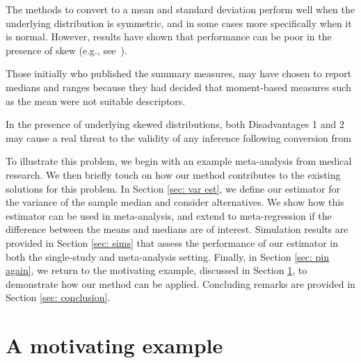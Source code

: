 \documentclass{article}
\begin{document}
\begin{disadv}\label{disadv:1}
The methods to convert to a mean and standard deviation perform well when the underlying distribution is symmetric, and in some cases more specifically when it is normal.  However, results have shown that performance can be poor in the presence of skew (e.g., see~\cite{shi2018estimate}).
\end{disadv}

\begin{disadv}\label{disadv:2}
Those initially who published the summary measures, may have chosen to report medians and ranges because they had decided that moment-based measures such as the mean were not suitable descriptors.
\end{disadv}

In the presence of underlying skewed distributions, both Disadvantages 1 and 2 may cause a real threat to the validity of any inference following conversion from

To illustrate this problem, we begin with an example meta-analysis from medical research. We then briefly touch on how our method contributes to the existing solutions for this problem. In Section \ref{sec: var est}, we define our estimator for the variance of the sample median and consider alternatives. We show how this estimator can be used in meta-analysis, and extend to meta-regression if the difference between the means and medians are of interest. Simulation results are provided in Section \ref{sec: sims} that assess the performance of our estimator in both the single-study and meta-analysis setting.   Finally, in Section \ref{sec: pin again}, we return to the motivating example, discussed in Section \ref{sec: motiv}, to demonstrate how our method can be applied. Concluding remarks are provided in Section \ref{sec: conclusion}.

\section{A motivating example}
\label{sec: motiv}
\end{document}
